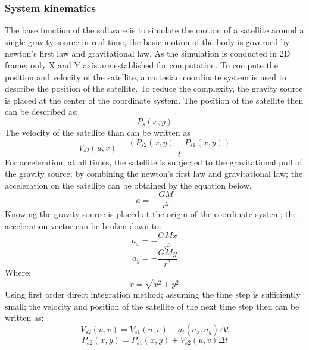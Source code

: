 \documentclass[12pt, letter]{article}
\begin{document}
\subsubsection {System kinematics}
The base function of the software is to simulate the motion of a satellite around a single gravity source in real time, the basic motion of the body is governed by newton’s first law and gravitational law. As the simulation is conducted in 2D frame; only X and Y axis are established for computation.
To compute the position and velocity of the satellite, a cartesian coordinate system is used to describe the position of the satellite. To reduce the complexity, the gravity source is placed at the center of the coordinate system. The position of the satellite then can be described as:
\begin{equation} \label{eq:position}
P_s (x,y)
\end{equation}
The velocity of the satellite than can be written as
\begin{equation} \label{eq:velocity}
V_{s2} (u,v)=\frac{(P_{s2} (x,y)-P_{s1} (x,y))}{t}
\end{equation}
For acceleration, at all times, the satellite is subjected to the gravitational pull of the gravity source; by combining the newton’s first law and gravitational law; the acceleration on the satellite can be obtained by the equation below.
\begin{equation} \label{acceleration}
a=-\frac{GM}{r^2}
\end{equation}
Knowing the gravity source is placed at the origin of the coordinate system; the acceleration vector can be broken down to:
\begin{equation} \label{acceleration_x}
a_x=-\frac{GMx}{r^3}
\end{equation}
\begin{equation} \label{acceleration_y}
a_y=-\frac{GMy}{r^3}
\end{equation}
Where:
\begin{equation} \label{r defination}
r=\sqrt{x^2+y^2}
\end{equation}
Using first order direct integration method; assuming the time step is sufficiently small; the velocity and position of the satellite of the next time step then can be written as:
\begin{equation} \label{next step velocity}
V_{s2} (u,v)=V_{s1} (u,v)+a_t(a_x,a_y )\Delta t
\end{equation}
\begin{equation} \label{next step position}
P_{s2} (x,y)=P_{s1} (x,y)+V_{s2}(u,v)\Delta t
\end{equation}
\end{document}
